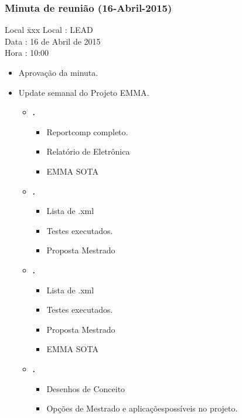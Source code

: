 \subsubsection{Minuta de reunião (16-Abril-2015)}

\begin{tabbing}
  Local \= xxx \kill
  Local \> : LEAD \\
  Data  \> : 16 de Abril de 2015 \\
  Hora  \> : 10:00
\end{tabbing}


\begin{itemize}
  \item Aprovação da minuta.

  \item Update semanal do Projeto EMMA.
  
  \begin{itemize}
    \item \textbf{\renan.} 
		\begin{itemize}    
			 \item Reportcomp completo.
			 \item Relatório de Eletrônica
			 \item EMMA SOTA 
			
		\end{itemize}
		
		
    \item \textbf{\elael.} 
    		\begin{itemize}    
			 \item Lista de .xml
			 \item Testes executados.
			 \item Proposta Mestrado
			\end{itemize}
					
			
    \item \textbf{\gabriel.} 
    		\begin{itemize}    
			 \item Lista de .xml
			 \item Testes executados.
			 \item Proposta Mestrado
			 \item EMMA SOTA
			\end{itemize}

		 \item \textbf{\julia.} 
    		\begin{itemize}    
			 \item Desenhos de Conceito
			 \item Opções de Mestrado e aplicaçõespossíveis no projeto.
			\end{itemize}


\end{itemize}
\end{itemize}
